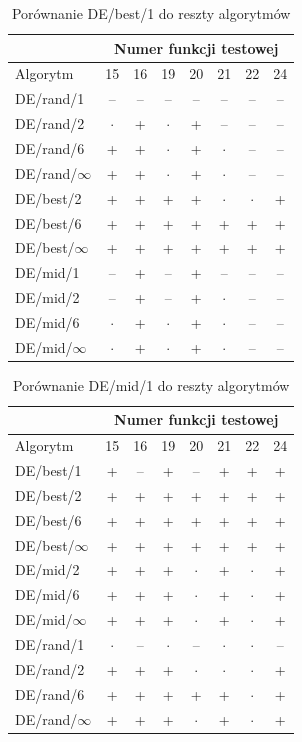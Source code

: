 \documentclass[a4paper,onecolumn,oneside,12pt,wide,floatssmall]{mwrep}
\theoremstyle{definition}
\theoremstyle{plain}%
\theoremstyle{remark}
\begin{document}
\begin{table}[H]
\centering
\begin{tabular}{ l | c | c | c | c | c | c | c }
		 & \multicolumn{7}{c}{Numer funkcji testowej}  \\  \hline
Algorytm         &15& 16& 19& 20& 21& 22& 24 \\ \hline
DE/rand/1	 & -- & -- & -- & -- & -- & -- & -- \\
DE/rand/2	 & $\cdot$ & + & $\cdot$ & + & -- & -- & -- \\
DE/rand/6	 & + & + & $\cdot$ & + & $\cdot$ & -- & -- \\
DE/rand/$\infty$	 & + & + & $\cdot$ & + & $\cdot$ & -- & -- \\
DE/best/2	 & + & + & + & + & $\cdot$ & $\cdot$ & + \\
DE/best/6	 & + & + & + & + & + & + & + \\
DE/best/$\infty$	 & + & + & + & + & + & + & + \\
DE/mid/1	 & -- & + & -- & + & -- & -- & -- \\
DE/mid/2	 & -- & + & -- & + & $\cdot$ & -- & -- \\
DE/mid/6	 & $\cdot$ & + & $\cdot$ & + & $\cdot$ & -- & -- \\
DE/mid/$\infty$	 & $\cdot$ & + & $\cdot$ & + & $\cdot$ & -- & -- \\
\end{tabular}
\caption{Porównanie DE/best/1 do reszty algorytmów}
\end{table}

\begin{table}[H]
\centering
\begin{tabular}{ l | c | c | c | c | c | c | c | }
		 & \multicolumn{7}{c}{Numer funkcji testowej}  \\  \hline
Algorytm         &15& 16& 19& 20& 21& 22& 24 \\ \hline
DE/best/1	 & + & -- & + & -- & + & + & + \\
DE/best/2	 & + & + & + & + & + & + & + \\
DE/best/6	 & + & + & + & + & + & + & + \\
DE/best/$\infty$	 & + & + & + & + & + & + & + \\
DE/mid/2	 & + & + & + & $\cdot$ & + & $\cdot$ & + \\
DE/mid/6	 & + & + & + & $\cdot$ & + & $\cdot$ & + \\
DE/mid/$\infty$	 & + & + & + & $\cdot$ & + & $\cdot$ & + \\
DE/rand/1	 & $\cdot$ & -- & $\cdot$ & -- & $\cdot$ & $\cdot$ & -- \\
DE/rand/2	 & + & + & + & $\cdot$ & $\cdot$ & $\cdot$ & + \\
DE/rand/6	 & + & + & + & + & + & $\cdot$ & + \\
DE/rand/$\infty$	 & + & + & + & $\cdot$ & + & $\cdot$ & + \\
\end{tabular}
\caption{Porównanie DE/mid/1 do reszty algorytmów}
\end{table}
\end{document}
